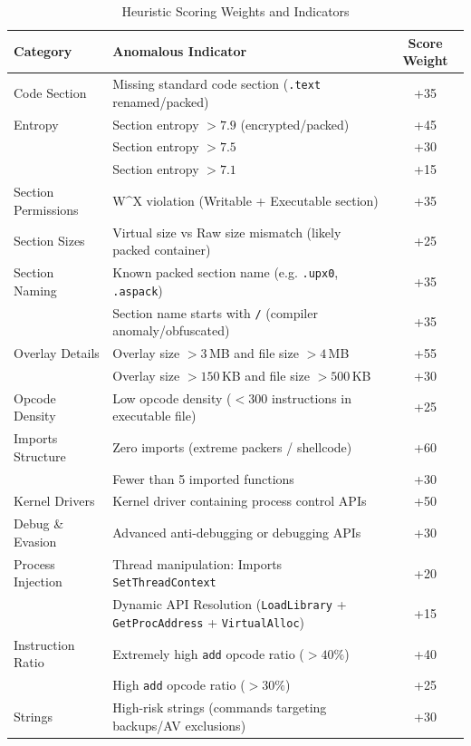 \documentclass[11pt,a4paper]{article}
\begin{document}
\begin{table}[h]
\centering
\caption{Heuristic Scoring Weights and Indicators}
\label{tab:weights}
\begin{tabular}{lp{10cm}c}
\toprule
\textbf{Category} & \textbf{Anomalous Indicator} & \textbf{Score Weight} \\
\midrule
Code Section & Missing standard code section (\texttt{.text} renamed/packed) & +35 \\
\midrule
Entropy & Section entropy $>7.9$ (encrypted/packed) & +45 \\
        & Section entropy $>7.5$ & +30 \\
        & Section entropy $>7.1$ & +15 \\
\midrule
Section Permissions & W\textasciicircum{}X violation (Writable + Executable section) & +35 \\
\midrule
Section Sizes & Virtual size vs Raw size mismatch (likely packed container) & +25 \\
\midrule
Section Naming & Known packed section name (e.g. \texttt{.upx0}, \texttt{.aspack}) & +35 \\
               & Section name starts with \texttt{/} (compiler anomaly/obfuscated) & +35 \\
\midrule
Overlay Details & Overlay size $>3$\,MB and file size $>4$\,MB & +55 \\
                & Overlay size $>150$\,KB and file size $>500$\,KB & +30 \\
\midrule
Opcode Density & Low opcode density ($<300$ instructions in executable file) & +25 \\
\midrule
Imports Structure & Zero imports (extreme packers / shellcode) & +60 \\
                  & Fewer than 5 imported functions & +30 \\
\midrule
Kernel Drivers & Kernel driver containing process control APIs & +50 \\
\midrule
Debug \& Evasion & Advanced anti-debugging or debugging APIs & +30 \\
\midrule
Process Injection & Thread manipulation: Imports \texttt{SetThreadContext} & +20 \\
                  & Dynamic API Resolution (\texttt{LoadLibrary} + \texttt{GetProcAddress} + \texttt{VirtualAlloc}) & +15 \\
\midrule
Instruction Ratio & Extremely high \texttt{add} opcode ratio ($>40\%$) & +40 \\
                  & High \texttt{add} opcode ratio ($>30\%$) & +25 \\
\midrule
Strings & High-risk strings (commands targeting backups/AV exclusions) & +30 \\
\bottomrule
\end{tabular}
\end{table}
\end{document}
